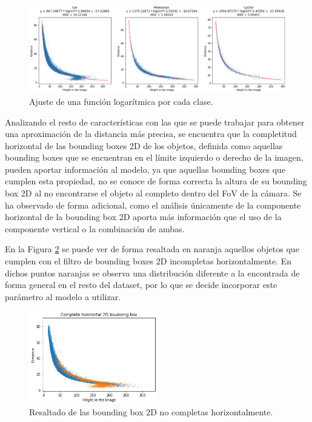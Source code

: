 \begin{figure}[H]
    \centering
    \includegraphics[width=1\textwidth]{Book/figures/6_approx_distancia/regression_classes_kitti1.png}
    \caption{Ajuste de una función logarítmica por cada clase.}
    \label{fig:Ajuste de una función logarítmica por cada clase.}
\end{figure}

Analizando el resto de características con las que se puede trabajar para obtener una aproximación de la distancia más precisa, se encuentra que la completitud horizontal de las bounding boxes 2D de los objetos, definida como aquellas bounding boxes que se encuentran en el límite izquierdo o derecho de la imagen, pueden aportar información al modelo, ya que aquellas bounding boxes que cumplen esta propiedad, no se conoce de forma correcta la altura de su bounding box 2D al no encontrarse el objeto al completo dentro del \ac{FoV} de la cámara. Se ha observado de forma adicional, como el análisis únicamente de la componente horizontal de la bounding box 2D aporta más información que el uso de la componente vertical o la combinación de ambas.

En la Figura \ref{fig:Resaltado de las bounding box 2D no completas horizontalmente.} se puede ver de forma resaltada en naranja aquellos objetos que cumplen con el filtro de bounding boxes 2D incompletas horizontalmente. En dichos puntos naranjas se observa una distribución diferente a la encontrada de forma general en el resto del dataset, por lo que se decide incorporar este parámetro al modelo a utilizar. 

\begin{figure}[H]
    \centering
    \includegraphics[width=0.5\textwidth]{Book/figures/6_approx_distancia/bb_complete_kitti1.png}
    \caption{Resaltado de las bounding box 2D no completas horizontalmente.}
    \label{fig:Resaltado de las bounding box 2D no completas horizontalmente.}
\end{figure}

